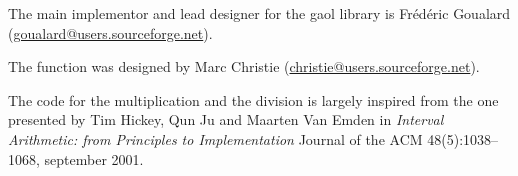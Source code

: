 \documentclass{manual}
\begin{document}
The main implementor and lead designer for the gaol library is Fr\'ed\'eric Goualard
(\href{mailto:goualard@users.sourceforge.net}{goualard@users.sourceforge.net}).

The  function
was designed by Marc Christie
(\href{mailto:christie@users.sourceforge.net}{christie@users.sourceforge.net}).

The code for the multiplication and the division is largely inspired
from the one presented by Tim Hickey, Qun Ju and Maarten Van Emden in
\emph{Interval Arithmetic: from Principles to Implementation} Journal
of the ACM 48(5):1038--1068, september 2001.


\label{chap:copying}




\printindex[idx]
\end{document}
